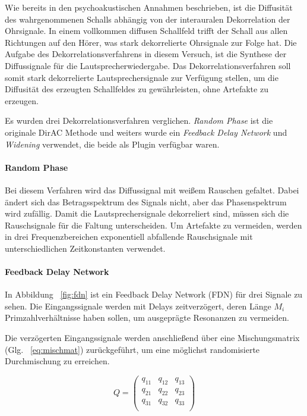 Wie bereits in den psychoakustischen Annahmen beschrieben, ist die Diffusität des wahrgenommenen Schalls abhängig von der interauralen Dekorrelation der Ohrsignale. In einem vollkommen diffusen Schallfeld trifft der Schall aus allen Richtungen auf den Hörer, was stark dekorrelierte Ohrsignale zur Folge hat. Die Aufgabe des Dekorrelationsverfahrens in diesem Versuch, ist die Synthese der Diffussignale für die Lautsprecherwiedergabe. Das Dekorrelationsverfahren soll somit stark dekorrelierte Lautsprechersignale zur Verfügung stellen, um die Diffusität des erzeugten Schallfeldes zu gewährleisten, ohne Artefakte zu erzeugen.

Es wurden drei Dekorrelationsverfahren verglichen. \textit{Random Phase} ist die originale DirAC Methode und weiters wurde ein \textit{Feedback Delay Network} und \textit{Widening} verwendet, die beide als Plugin verfügbar waren.

\paragraph{Random Phase}
Bei diesem Verfahren wird das Diffussignal mit weißem Rauschen gefaltet. Dabei ändert sich das Betragsspektrum des Signals nicht, aber das Phasenspektrum wird zufällig. Damit die Lautsprechersignale dekorreliert sind, müssen sich die Rauschsignale für die Faltung unterscheiden. Um Artefakte zu vermeiden, werden in drei Frequenzbereichen exponentiell abfallende Rauschsignale mit unterschiedlichen Zeitkonstanten verwendet.

\paragraph{Feedback Delay Network}

In Abbildung ~\ref{fig:fdn} ist ein Feedback Delay Network (FDN) für drei Signale zu sehen. Die Eingangssignale werden mit Delays zeitverzögert, deren Länge $M_i$ Primzahlverhältnisse haben sollen, um ausgeprägte Resonanzen zu vermeiden.

Die verzögerten Eingangssignale werden anschließend über eine Mischungsmatrix (Glg. ~\ref{eq:mischmat}) zurückgeführt, um eine möglichst randomisierte Durchmischung zu erreichen.

\begin{equation}
    Q = 
    \begin{pmatrix}
		q_{11} & q_{12} & q_{13} \\
        q_{21} & q_{22} & q_{23} \\
        q_{31} & q_{32} & q_{33} \\
    \end{pmatrix}
    \label{eq:mischmat}
\end{equation}

